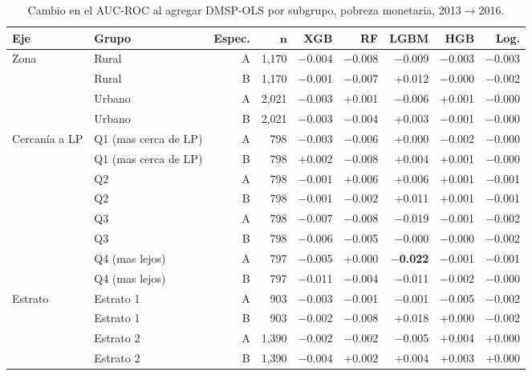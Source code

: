 \begin{table}[H]
  \centering
  \caption{Cambio en el AUC-ROC al agregar DMSP-OLS por subgrupo, pobreza monetaria, 2013$\to$2016.}
  \label{tab:heterogeneidad_dmsp}
  \footnotesize
  \setlength{\tabcolsep}{3pt}
  \begin{tabular}{llrrrrrrr}
    \toprule
    \textbf{Eje} & \textbf{Grupo} & \textbf{Espec.} & $\boldsymbol{n}$ & \textbf{XGB} & \textbf{RF} & \textbf{LGBM} & \textbf{HGB} & \textbf{Log.} \\
    \midrule
    Zona & Rural & A & 1{,}170 & $-$0.004 & $-$0.008 & $-$0.009 & $-$0.003 & $-$0.003 \\
     & Rural & B & 1{,}170 & $-$0.001 & $-$0.007 & +0.012 & $-$0.000 & $-$0.002 \\
    \addlinespace
     & Urbano & A & 2{,}021 & $-$0.003 & +0.001 & $-$0.006 & +0.001 & $-$0.000 \\
     & Urbano & B & 2{,}021 & $-$0.003 & $-$0.004 & +0.003 & $-$0.001 & $-$0.000 \\
    \midrule
    Cercanía a LP & Q1 (mas cerca de LP) & A & 798 & $-$0.003 & $-$0.006 & +0.000 & $-$0.002 & $-$0.000 \\
     & Q1 (mas cerca de LP) & B & 798 & +0.002 & $-$0.008 & +0.004 & +0.001 & $-$0.000 \\
    \addlinespace
     & Q2 & A & 798 & $-$0.001 & +0.006 & +0.006 & +0.001 & $-$0.001 \\
     & Q2 & B & 798 & $-$0.001 & $-$0.002 & +0.011 & +0.001 & $-$0.001 \\
    \addlinespace
     & Q3 & A & 798 & $-$0.007 & $-$0.008 & $-$0.019 & $-$0.001 & $-$0.002 \\
     & Q3 & B & 798 & $-$0.006 & $-$0.005 & $-$0.000 & $-$0.000 & $-$0.002 \\
    \addlinespace
     & Q4 (mas lejos) & A & 797 & $-$0.005 & +0.000 & \textbf{$-$0.022} & $-$0.001 & $-$0.001 \\
     & Q4 (mas lejos) & B & 797 & $-$0.011 & $-$0.004 & $-$0.011 & $-$0.002 & $-$0.000 \\
    \midrule
    Estrato & Estrato 1 & A & 903 & $-$0.003 & $-$0.001 & $-$0.001 & $-$0.005 & $-$0.002 \\
     & Estrato 1 & B & 903 & $-$0.002 & $-$0.008 & +0.018 & +0.000 & $-$0.002 \\
    \addlinespace
     & Estrato 2 & A & 1{,}390 & $-$0.002 & $-$0.002 & $-$0.005 & +0.004 & +0.000 \\
     & Estrato 2 & B & 1{,}390 & $-$0.004 & +0.002 & +0.004 & +0.003 & +0.000 \\

\end{tabular}
\end{table}
